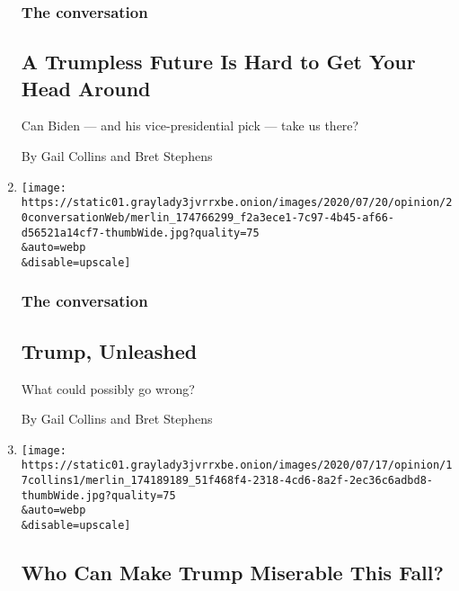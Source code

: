 \begin{enumerate}
  \hypertarget{the-conversation-1}{%
  \subsubsection{The conversation}\label{the-conversation-1}}

  \hypertarget{a-trumpless-future-is-hard-to-get-your-head-around}{%
  \subsection{A Trumpless Future Is Hard to Get Your Head
  Around}\label{a-trumpless-future-is-hard-to-get-your-head-around}}

  Can Biden --- and his vice-presidential pick --- take us there?

  By Gail Collins and Bret Stephens
\item
  \href{/2020/07/21/opinion/trump-portland-coronavirus.html}{}

  \texttt{[image: https://static01.graylady3jvrrxbe.onion/images/2020/07/20/opinion/20conversationWeb/merlin\_174766299\_f2a3ece1-7c97-4b45-af66-d56521a14cf7-thumbWide.jpg?quality=75\\\&auto=webp\\\&disable=upscale]}

  \hypertarget{the-conversation-2}{%
  \subsubsection{The conversation}\label{the-conversation-2}}

  \hypertarget{trump-unleashed}{%
  \subsection{Trump, Unleashed}\label{trump-unleashed}}

  What could possibly go wrong?

  By Gail Collins and Bret Stephens
\item
  \href{/2020/07/15/opinion/trump-sessions-senate.html}{}

  \texttt{[image: https://static01.graylady3jvrrxbe.onion/images/2020/07/17/opinion/17collins1/merlin\_174189189\_51f468f4-2318-4cd6-8a2f-2ec36c6adbd8-thumbWide.jpg?quality=75\\\&auto=webp\\\&disable=upscale]}

  \hypertarget{who-can-make-trump-miserable-this-fall}{%
  \subsection{Who Can Make Trump Miserable This
  Fall?}\label{who-can-make-trump-miserable-this-fall}}


\end{enumerate}
